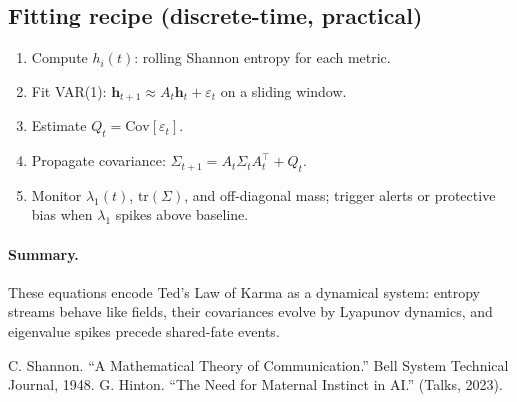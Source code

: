 \documentclass[11pt]{article}
\begin{document}
\subsection*{Fitting recipe (discrete-time, practical)}
\begin{enumerate}
\item Compute $h_i(t)$: rolling Shannon entropy for each metric.
\item Fit VAR(1): $\mathbf h_{t+1}\approx A_t \mathbf h_t + \varepsilon_t$ on a sliding window.
\item Estimate $Q_t=\mathrm{Cov}[\varepsilon_t]$.
\item Propagate covariance: $\Sigma_{t+1}=A_t\Sigma_tA_t^\top+Q_t$.
\item Monitor $\lambda_1(t)$, $\mathrm{tr}(\Sigma)$, and off-diagonal mass; trigger alerts or protective bias when $\lambda_1$ spikes above baseline.
\end{enumerate}

\paragraph{Summary.}
These equations encode Ted's Law of Karma as a dynamical system: entropy streams behave like fields, their covariances evolve by Lyapunov dynamics, and eigenvalue spikes precede shared-fate events.

\begin{thebibliography}{9}
 C. Shannon. ``A Mathematical Theory of Communication.'' Bell System Technical Journal, 1948.
 G. Hinton. ``The Need for Maternal Instinct in AI.'' (Talks, 2023).
\end{thebibliography}
\end{document}
